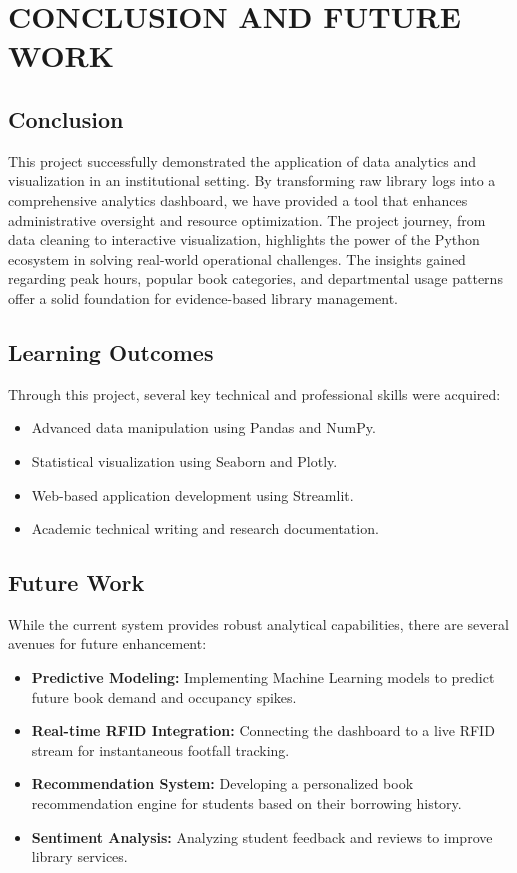 \documentclass[12pt,a4paper]{report}
\begin{document}
\chapter{CONCLUSION AND FUTURE WORK}
\section{Conclusion}
This project successfully demonstrated the application of data analytics and visualization in an institutional setting. By transforming raw library logs into a comprehensive analytics dashboard, we have provided a tool that enhances administrative oversight and resource optimization. The project journey, from data cleaning to interactive visualization, highlights the power of the Python ecosystem in solving real-world operational challenges. The insights gained regarding peak hours, popular book categories, and departmental usage patterns offer a solid foundation for evidence-based library management.

\section{Learning Outcomes}
Through this project, several key technical and professional skills were acquired:
\begin{itemize}
    \item Advanced data manipulation using Pandas and NumPy.
    \item Statistical visualization using Seaborn and Plotly.
    \item Web-based application development using Streamlit.
    \item Academic technical writing and research documentation.
\end{itemize}

\section{Future Work}
While the current system provides robust analytical capabilities, there are several avenues for future enhancement:
\begin{itemize}
    \item \textbf{Predictive Modeling:} Implementing Machine Learning models to predict future book demand and occupancy spikes.
    \item \textbf{Real-time RFID Integration:} Connecting the dashboard to a live RFID stream for instantaneous footfall tracking.
    \item \textbf{Recommendation System:} Developing a personalized book recommendation engine for students based on their borrowing history.
    \item \textbf{Sentiment Analysis:} Analyzing student feedback and reviews to improve library services.
\end{itemize}
\end{document}
